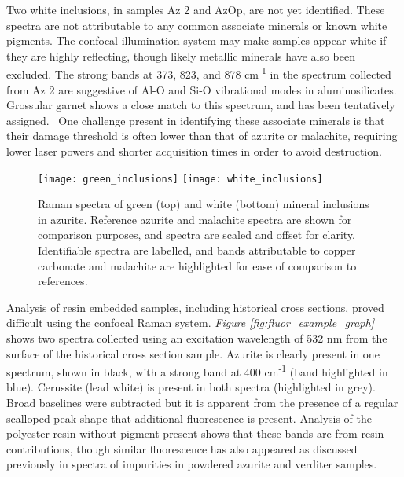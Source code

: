 Two white inclusions, in samples Az 2 and AzOp, are not yet identified. These spectra are not attributable to any common associate minerals or known white pigments. The confocal illumination system may make samples appear white if they are highly reflecting, though likely metallic minerals have also been excluded. The strong bands at 373, 823, and 878 cm\textsuperscript{-1} in the spectrum collected from Az 2 are suggestive of Al-O and Si-O vibrational modes in aluminosilicates. Grossular garnet shows a close match to this spectrum, and has been tentatively assigned.~\autocite{Culka} One challenge present in identifying these associate minerals is that their damage threshold is often lower than that of azurite or malachite, requiring lower laser powers and shorter acquisition times in order to avoid destruction.

\begin{figure}[H]
\centering
\begin{minipage}[t]{\linewidth}
  \centering
  \texttt{[image: green\_inclusions]}
\hfill
\texttt{[image: white\_inclusions]}
\hfill
\end{minipage}
\caption[Raman spectra of green and white mineral inclusions in azurite.]{Raman spectra of green (top) and white (bottom) mineral inclusions in azurite. Reference azurite and malachite spectra are shown for comparison purposes, and spectra are scaled and offset for clarity. Identifiable spectra are labelled, and bands attributable to copper carbonate and malachite are highlighted for ease of comparison to references.}
\label{fig:label_raman}
\end{figure}

Analysis of resin embedded samples, including historical cross sections, proved difficult using the confocal Raman system. \textit{Figure \ref{fig:fluor_example_graph}} shows two spectra collected using an excitation wavelength of 532 nm from the surface of the historical cross section sample. Azurite is clearly present in one spectrum, shown in black, with a strong band at 400 cm\textsuperscript{-1} (band highlighted in blue). Cerussite (lead white) is present in both spectra (highlighted in grey). Broad baselines were subtracted but it is apparent from the presence of a regular scalloped peak shape that additional fluorescence is present. Analysis of the polyester resin without pigment present shows that these bands are from resin contributions, though similar fluorescence has also appeared as discussed previously in spectra of impurities in powdered azurite and verditer samples. 

